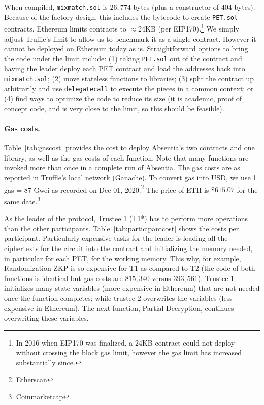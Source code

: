 When compiled, \texttt{mixmatch.sol} is $26,774$ bytes (plus a constructor of $404$ bytes). Because of the factory design, this includes the bytecode to create \texttt{PET.sol} contracts. Ethereum limits contracts to $\approx$24KB (per EIP170).\footnote{In 2016 when EIP170 was finalized, a 24KB contract could not deploy without crossing the block gas limit, however the gas limit has increased substantially since.} We simply adjust Truffle's limit to allow us to benchmark it as a single contract. However it cannot be deployed on Ethereum today as is. Straightforward options to bring the code under the limit include: (1) taking \texttt{PET.sol} out of the contract and having the leader deploy each PET contract and load the addresses back into \texttt{mixmatch.sol}; (2) move stateless functions to libraries; (3) split the contract up arbitrarily and use \texttt{delegatecall} to execute the pieces in a common context; or (4) find ways to optimize the code to reduce its size (it is academic, proof of concept code, and is very close to the limit, so this should be feasible). 


 





\paragraph{Gas costs.} 

Table~\ref{tab:gascost} provides the cost to deploy Absentia's two contracts and one library, as well as the gas costs of each function. Note that many functions are invoked more than once in a complete run of Absentia. The gas costs are as reported in Truffle's local network (Ganache). To convert gas into USD, we use 1 gas = 87 Gwei as recorded on Dec 01, 2020.\footnote{\href{https://etherscan.io/chart/gasprice}{Etherscan}} The price of ETH is $\$615.07$ for the same date.\footnote{\href{https://coinmarketcap.com/currencies/ethereum/historical-data/}{Coinmarketcap}}

As the leader of the protocol, Trustee 1 (T1*) has to perform more operations than the other participants. Table~\ref{tab:participantcost} shows the costs per participant. Particularly expensive tasks for the leader is loading all the ciphertexts for the circuit into the contract and initializing the memory needed, in particular for each PET, for the working memory. This why, for example, Randomization ZKP is so expensive for T1 as compared to T2 (the code of both functions is identical but gas costs are $815,340$ versus $393,561$). Trustee 1 initializes many state variables (more expensive in Ethereum) that are not needed once the function completes; while trustee 2 overwrites the variables (less expensive in Ethereum). The next function, Partial Decryption, continues overwriting these variables. 

